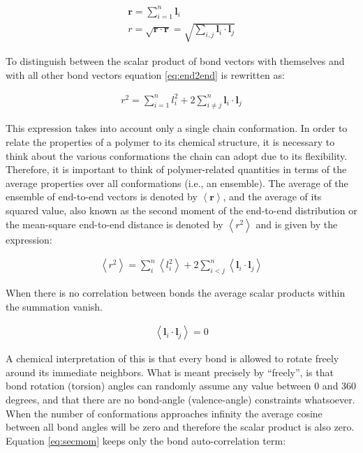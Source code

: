 \begin{gather}
\label{eq:e2e}
\mathbf{r} = \sum_{i=1}^{n} \mathbf{l}_{i}\\
\label{eq:end2end}
r = \sqrt{\mathbf{r} \cdot \mathbf{r}}
  = \sqrt{\sum_{i,j}\mathbf{l}_{i} \cdot \mathbf{l}_{j}}
\end{gather}

To  distinguish  between  the  scalar  product of  bond  vectors  with
themselves and  with all other bond  vectors equation \ref{eq:end2end}
is rewritten as:

\begin{gather}
r^2 = \sum_{i=1}^{n}l_{i}^{2} + 2 \sum_{i\neq j}^{n}
\mathbf{l}_{i} \cdot \mathbf{l}_{j}
\end{gather}  

This   expression   takes   into   account   only   a   single   chain
conformation. In  order to relate the  properties of a  polymer to its
chemical  structure,  it  is  necessary  to think  about  the  various
conformations the chain can  adopt due to its flexibility.  Therefore,
it is important to think of polymer-related quantities in terms of the
average  properties over  all conformations  (i.e., an  ensemble). The
average of  the ensemble of  end-to-end vectors is denoted  by $\left<
\mathbf{r} \right>$, and the average  of its squared value, also known
as the second moment of the end-to-end distribution or the mean-square
end-to-end distance is denoted by $\left< r^2 \right>$ and is given by
the expression:

\begin{gather}
\label{eq:secmom}  
\left<r^2\right>=\sum_{i}^{n}\left<l_{i}^2\right> +
2\sum_{i<j}^{n}\left<\mathbf{l}_{i} \cdot \mathbf{l}_{j}\right>
\end{gather}  

When there is no correlation between bonds the average scalar products
within the summation vanish.

\begin{gather}
\label{eq:nocorr}
\left<\mathbf{l}_{i} \cdot \mathbf{l}_{j}\right> = 0
\end{gather}

A chemical  interpretation of  this is that  every bond is  allowed to
rotate freely around its immediate neighbors.  What is meant precisely
by  ``freely'', is that  bond rotation  (torsion) angles  can randomly
assume any  value between  0 and  360 degrees, and  that there  are no
bond-angle (valence-angle) constraints whatsoever.  When the number of
conformations approaches infinity the  average cosine between all bond
angles will  be zero  and therefore the  scalar product is  also zero.
Equation \ref{eq:secmom} keeps only the bond auto-correlation term:

